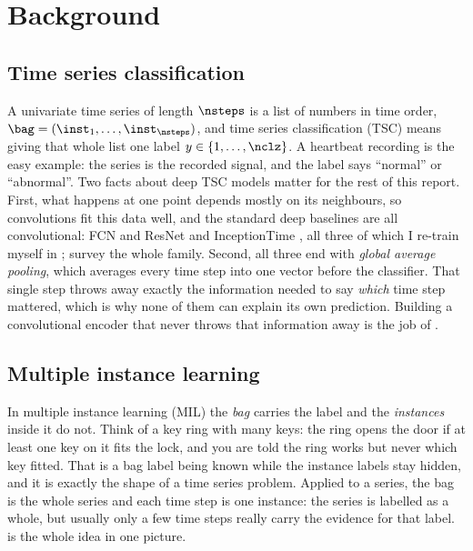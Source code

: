 %

\section{Background}
\label{sec:background}

\subsection{Time series classification}
\label{sec:bg:tsc}

A univariate time series of length $\nsteps$ is a list of numbers in time order,
$\bag = (\inst_1, \dots, \inst_{\nsteps})$, and time series classification (TSC) means giving that
whole list one label $y \in \{1, \dots, \nclz\}$. A heartbeat recording is the easy example: the
series is the recorded signal, and the label says ``normal'' or ``abnormal''. Two facts about deep
TSC models matter for the rest of this report. First, what happens at one point depends mostly on
its neighbours, so convolutions fit this data well, and the standard deep baselines are all
convolutional: FCN and ResNet \citep{wang2017fcn} and InceptionTime \citep{fawaz2020inceptiontime},
all three of which I re-train myself in ; \citet{fawaz2019review} survey
the whole family. Second, all three end with \emph{global average pooling}, which averages every
time step into one vector before the classifier. That single step throws away exactly the
information needed to say \emph{which} time step mattered, which is why none of them can explain its
own prediction. Building a convolutional encoder that never throws that information away is the job
of .

\subsection{Multiple instance learning}
\label{sec:bg:mil}

In multiple instance learning (MIL) \citep{dietterich1997mil} the \emph{bag} carries the label and
the \emph{instances} inside it do not. Think of a key ring with many keys: the ring opens the door if
at least one key on it fits the lock, and you are told the ring works but never which key fitted.
That is a bag label being known while the instance labels stay hidden, and it is exactly the shape
of a time series problem. Applied to a series, the bag is the whole series and each time step is one
instance: the series is labelled as a whole, but usually only a few time steps really carry the
evidence for that label.  is the whole idea in one picture.

